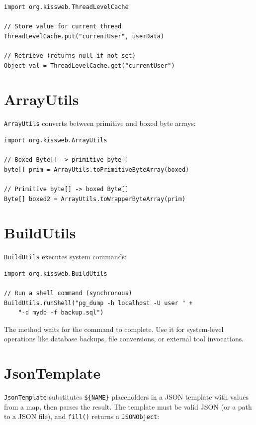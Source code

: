 \begin{lstlisting}[style=groovy]
import org.kissweb.ThreadLevelCache

// Store value for current thread
ThreadLevelCache.put("currentUser", userData)

// Retrieve (returns null if not set)
Object val = ThreadLevelCache.get("currentUser")
\end{lstlisting}

\section{ArrayUtils}
\label{sec:util-arrayutils}

\texttt{ArrayUtils} converts between primitive and boxed byte arrays:

\begin{lstlisting}[style=groovy]
import org.kissweb.ArrayUtils

// Boxed Byte[] -> primitive byte[]
byte[] prim = ArrayUtils.toPrimitiveByteArray(boxed)

// Primitive byte[] -> boxed Byte[]
Byte[] boxed2 = ArrayUtils.toWrapperByteArray(prim)
\end{lstlisting}

\section{BuildUtils}
\label{sec:util-buildutils}

\texttt{BuildUtils} executes system commands:

\begin{lstlisting}[style=groovy]
import org.kissweb.BuildUtils

// Run a shell command (synchronous)
BuildUtils.runShell("pg_dump -h localhost -U user " +
    "-d mydb -f backup.sql")
\end{lstlisting}

\noindent
The method waits for the command to complete.  Use it for system-level operations like database backups, file conversions, or external tool invocations.

\section{JsonTemplate}
\label{sec:util-jsontemplate}

\texttt{JsonTemplate} substitutes \texttt{\$\{NAME\}} placeholders in a JSON template with values from a map, then parses the result.  The template must be valid JSON (or a path to a JSON file), and \texttt{fill()} returns a \texttt{JSONObject}:

